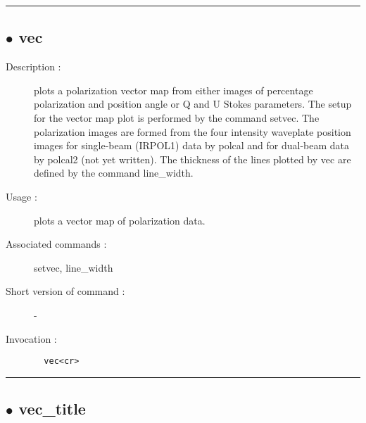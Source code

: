 \hrule \subsection*{$\bullet$ vec}
\begin{description}
\item[Description :] plots a polarization vector map from either images of percentage
polarization and position angle or Q and U Stokes parameters.  The setup
for the vector map plot is performed by the command setvec.  The
polarization images are formed from the four intensity waveplate position
images for single-beam (IRPOL1) data by polcal and for dual-beam data by
polcal2 (not yet written).  The thickness of the lines plotted by vec are
defined by the command line\_width.
\item[Usage :] plots a vector map of polarization data.
\item[Associated commands :] setvec, line\_width
\item[Short version of command :] -
\item[Invocation :]

\verb+  vec<cr> +\end{description}

\hrule \subsection*{$\bullet$ vec\_title}

